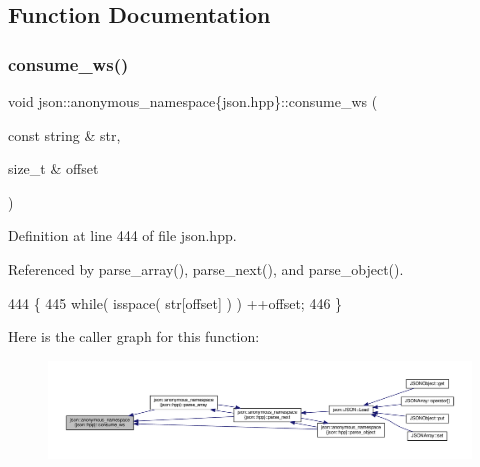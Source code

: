 \subsection{Function Documentation}
\mbox{\label{namespacejson_1_1anonymous__namespace_02json_8hpp_03_a3a6e9a9e2d1cf7848055ae69f04be8b7}} 
\subsubsection{\texorpdfstring{consume\+\_\+ws()}{consume\_ws()}}
{\footnotesize\ttfamily void json\+::anonymous\+\_\+namespace\{json.\+hpp\}\+::consume\+\_\+ws (\begin{DoxyParamCaption}\item[{const string \&}]{str,  }\item[{size\+\_\+t \&}]{offset }\end{DoxyParamCaption})}



Definition at line 444 of file json.\+hpp.



Referenced by parse\+\_\+array(), parse\+\_\+next(), and parse\+\_\+object().


\begin{DoxyCode}
444                                                          \{
445         \textcolor{keywordflow}{while}( isspace( str[offset] ) ) ++offset;
446     \}
\end{DoxyCode}
Here is the caller graph for this function\+:
\nopagebreak
\begin{figure}[H]
\begin{center}
\leavevmode
\includegraphics[width=350pt]{namespacejson_1_1anonymous__namespace_02json_8hpp_03_a3a6e9a9e2d1cf7848055ae69f04be8b7_icgraph}
\end{center}
\end{figure}
\mbox{\label{namespacejson_1_1anonymous__namespace_02json_8hpp_03_a623a6fca4cd1735d2bf3d081b875a350}} 
